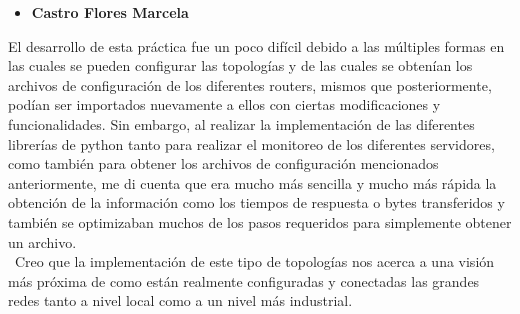 \begin{itemize}
\item \textbf{Castro Flores Marcela}
\end{itemize}

El desarrollo de esta práctica fue un poco difícil debido a las múltiples formas en las cuales se pueden configurar las topologías y de las cuales se obtenían los archivos de configuración de los diferentes routers, mismos que posteriormente, podían ser importados nuevamente a ellos con ciertas modificaciones y funcionalidades. Sin embargo, al realizar la implementación de las diferentes librerías de python tanto para realizar el monitoreo de los diferentes servidores, como también para obtener los archivos de configuración mencionados anteriormente, me di cuenta que era mucho más sencilla y mucho más rápida la obtención de la información como los tiempos de respuesta o bytes transferidos y también se optimizaban muchos de los pasos requeridos para simplemente obtener un archivo.\\ \
Creo que la implementación de este tipo de topologías nos acerca a una visión más próxima de como están realmente configuradas y conectadas las grandes redes tanto a nivel local como a un nivel más industrial.


